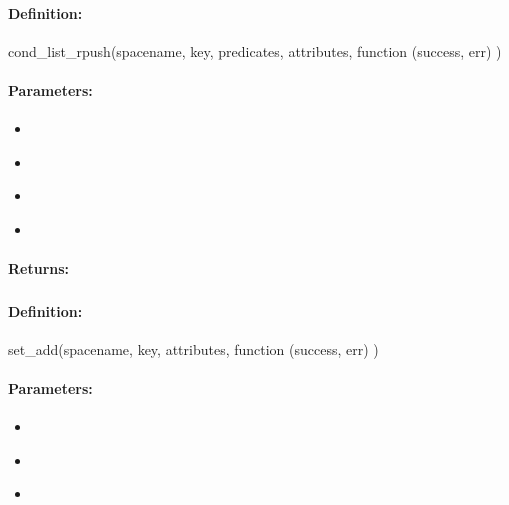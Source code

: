 \paragraph{Definition:}
\begin{javascriptcode}
cond_list_rpush(spacename, key, predicates, attributes, function (success, err) {})
\end{javascriptcode}
\paragraph{Parameters:}
\begin{itemize}[noitemsep]
\item {}\\

\item {}\\

\item {}\\

\item {}\\

\end{itemize}

\paragraph{Returns:}


\pagebreak
\subsubsection{}
\label{api:nodejs:set_add}


\paragraph{Definition:}
\begin{javascriptcode}
set_add(spacename, key, attributes, function (success, err) {})
\end{javascriptcode}
\paragraph{Parameters:}
\begin{itemize}[noitemsep]
\item {}\\

\item {}\\

\item {}\\

\end{itemize}

